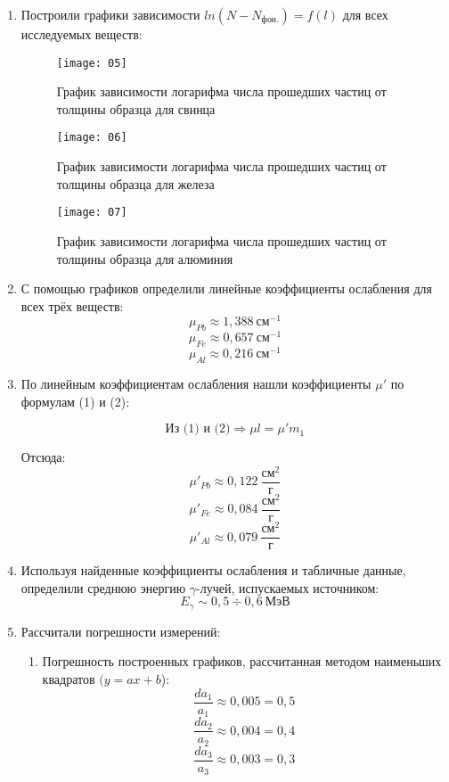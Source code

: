 \documentclass{physlab}
\begin{document}
\begin{enumerate}
	\item Построили графики зависимости $ln(N-N_\text{фон.}) = f(l)$ для всех исследуемых веществ:
	\begin{figure}[H]
		\begin{minipage}[h]{0.49\textwidth}
			\centering
			\texttt{[image: 05]}
			\caption{График зависимости логарифма числа прошедших частиц от толщины образца для свинца}
		\end{minipage}
	\hfill
		\begin{minipage}[h]{0.49\textwidth}
			\centering
			\texttt{[image: 06]}
			\caption{График зависимости логарифма числа прошедших частиц от толщины образца для железа}
		\end{minipage}
	\end{figure}

	\begin{figure}[H]
		\centering
		\texttt{[image: 07]}
		\caption{График зависимости логарифма числа прошедших частиц от толщины образца для алюминия}
	\end{figure}
		
	\item С помощью графиков определили линейные коэффициенты ослабления для всех трёх веществ:
	\[ \mu_{Pb}\approx1,388 ~\text{см}^{-1} \]
	\[ \mu_{Fe}\approx0,657 ~\text{см}^{-1} \]
	\[ \mu_{Al}\approx0,216 ~\text{см}^{-1} \]
	
	\item По линейным коэффициентам ослабления нашли коэффициенты $\mu'$ по формулам (1) и (2):
	 
    \begin{equation}
	\text{Из (1) и (2)} \Rightarrow \mu l = \mu' m_1
	\end{equation}
	
	Отсюда:
    \[ \mu'_{Pb} \approx 0,122 ~\frac{\text{см}^2}{\text{г}} \]
	\[ \mu'_{Fe} \approx 0,084 ~\frac{\text{см}^2}{\text{г}} \]
	\[ \mu'_{Al} \approx 0,079 ~\frac{\text{см}^2}{\text{г}} \]
	
	\item Используя найденные коэффициенты ослабления и табличные данные, определили среднюю энергию $\gamma$-лучей, испускаемых источником:
	\[ E_{\gamma} \sim 0,5\div0,6 ~\text{МэВ} \]
		
	\item Рассчитали погрешности измерений:
    \begin{enumerate}
        \item Погрешность построенных графиков, рассчитанная методом наименьших квадратов $(y=ax+b$):
        \[ \frac{da_1}{a_1} \approx 0,005 = 0,5\ \]
        \[ \frac{da_2}{a_2} \approx 0,004 = 0,4\ \]
        \[ \frac{da_3}{a_3} \approx 0,003 = 0,3\ \]
        

\end{enumerate}
\end{enumerate}
\end{document}
